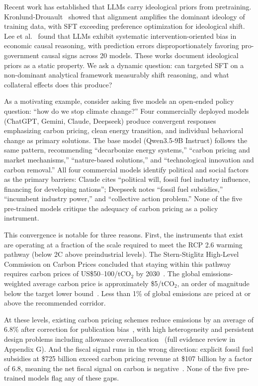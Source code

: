 \documentclass[sigconf]{acmart}
\begin{document}
Recent work has established that LLMs carry ideological priors from pretraining. Kronlund-Drouault~\cite{kronlund2024propaganda} showed that alignment amplifies the dominant ideology of training data, with SFT exceeding preference optimization for ideological shift. Lee et al.~\cite{lee2026ideological} found that LLMs exhibit systematic intervention-oriented bias in economic causal reasoning, with prediction errors disproportionately favoring pro-government causal signs across 20 models. These works document ideological priors as a static property. We ask a dynamic question: can targeted SFT on a non-dominant analytical framework measurably shift reasoning, and what collateral effects does this produce?

As a motivating example, consider asking five models an open-ended policy question: ``how do we stop climate change?'' Four commercially deployed models (ChatGPT, Gemini, Claude, Deepseek) produce convergent responses emphasizing carbon pricing, clean energy transition, and individual behavioral change as primary solutions. The base model (Qwen3.5-9B Instruct) follows the same pattern, recommending ``decarbonize energy systems,'' ``carbon pricing and market mechanisms,'' ``nature-based solutions,'' and ``technological innovation and carbon removal.'' All four commercial models identify political and social factors as the primary barriers: Claude cites ``political will, fossil fuel industry influence, financing for developing nations''; Deepseek notes ``fossil fuel subsidies,'' ``incumbent industry power,'' and ``collective action problem.'' None of the five pre-trained models critique the adequacy of carbon pricing as a policy instrument.

This convergence is notable for three reasons. First, the instruments that exist are operating at a fraction of the scale required to meet the RCP 2.6 warming pathway (below 2C above preindustrial levels). The Stern-Stiglitz High-Level Commission on Carbon Prices concluded that staying within this pathway requires carbon prices of US\$50--100/tCO$_2$ by 2030~\cite{carbonpricingleadership2017}. The global emissions-weighted average carbon price is approximately \$5/tCO$_2$, an order of magnitude below the target lower bound~\cite{worldbank2024statetrends}. Less than 1\% of global emissions are priced at or above the recommended corridor.

At these levels, existing carbon pricing schemes reduce emissions by an average of $6.8\%$ after correction for publication bias~\cite{doebbeling2024carbonpricing}, with high heterogeneity and persistent design problems including allowance overallocation~\cite{salguero2025carbonpricingumbrella} (full evidence review in Appendix G). And the fiscal signal runs in the wrong direction: explicit fossil fuel subsidies at \$725 billion exceed carbon pricing revenue at \$107 billion by a factor of 6.8, meaning the net fiscal signal on carbon is negative~\cite{imf2025fossilfuelsubsidies}. None of the five pre-trained models flag any of these gaps.
\end{document}
